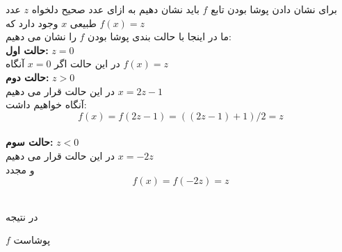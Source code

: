 \begin{solution}
    برای نشان دادن پوشا بودن تابع 
    $f$
    باید نشان دهیم به ازای عدد صحیح دلخواه 
    $z$
    عدد طبیعی
    $x$
    وجود دارد که 
    $f(x) = z$
    \\
    ما در اینجا با حالت بندی پوشا بودن 
    $f$
    را نشان می دهیم:
    \\
    \textbf{حالت اول: } 
    $z = 0$
    \\
    در این حالت اگر
    $x = 0$
    آنگاه
    $f(x) = z$
    \\
    \textbf{حالت دوم:}
    $z > 0$
    \\
    در این حالت قرار می دهیم 
    $x = 2z - 1$
    \\
    آنگاه خواهیم داشت:
    \[f(x) = f(2z-1) = ((2z-1)+1)/2 = z\]
    \\
    \textbf{حالت سوم:}
    $z < 0$
    \\
    در این حالت قرار می دهیم
    $x = -2z$
    \\
    و مجدد
    \[f(x) = f(-2z) = z\]

    \\
    در نتیجه
    
    $f$
    پوشاست 

\end{solution}
